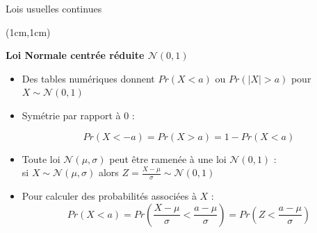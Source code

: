 \documentclass{beamer}
\begin{document}
\begin{frame}{Lois usuelles continues}
\begin{textblock*}{\textwidth}(1cm,1cm)

\begin{center}{\bf \Large Loi Normale centrée réduite $\mathcal{N}(0,1)$} \end{center}

\begin{itemize}
\item Des tables numériques donnent $Pr(X<a)$ ou $Pr(|X|>a)$ pour $X\sim \mathcal{N}(0,1)$

\item Symétrie par rapport à 0 :

\vspace{-1mm}$$Pr(X<-a)=Pr(X>a)=1-Pr(X<a)$$

\item Toute loi $\mathcal{N}(\mu,\sigma)$ peut être ramenée à une loi $\mathcal{N}(0,1)$ : \\
si $X\sim\mathcal{N}(\mu,\sigma)$ alors  $Z=\displaystyle \frac{X-\mu }{\sigma}\sim \mathcal{N}(0,1)$

\item Pour calculer des probabilités associées à $X$ :
$$
Pr(X<a) = Pr\left( \frac{X-\mu}{\sigma} < \frac{a-\mu}{\sigma}\right) = Pr\left(Z< \frac{a-\mu}{\sigma} \right)
$$

\end{itemize}

\end{textblock*}

\end{frame}



\end{document}
